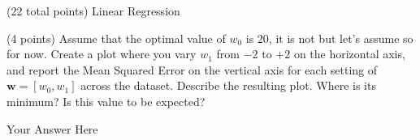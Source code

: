 \documentclass[12pt]{article}
\begin{document}
\begin{question}{(22 total points) Linear Regression}
\begin{subquestion}
\end{subquestion}




%
%
\begin{subquestion}{(4 points) Assume that the optimal value of $w_0$ is $20$, it is not but let's assume so for now. 
Create a plot where you vary $w_1$ from $-2$ to $+2$ on the horizontal axis, and report the Mean Squared Error on the vertical axis for each setting of $\mathbf{w} = [w_0, w_1]$ across the dataset. 
Describe the resulting plot. Where is its minimum? Is this value to be expected?\\ 
}


\begin{answerbox}{35em}
Your Answer Here
\end{answerbox}



\end{subquestion}


 
\end{question}





\clearpage
\end{document}

